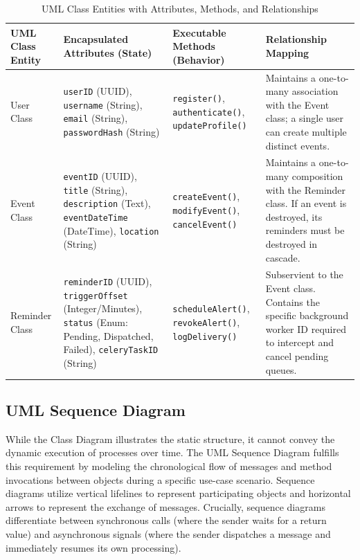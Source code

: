 \begin{table}[h]
	\centering
	\caption{UML Class Entities with Attributes, Methods, and Relationships}
	\label{tab:uml-class-diagram}
	\renewcommand{\arraystretch}{1.3}
	\begin{tabular}{|>{\raggedright\arraybackslash}p{}|>{\raggedright\arraybackslash}p{}|>{\raggedright\arraybackslash}p{}|>{\raggedright\arraybackslash}p{}|}
		\hline
		\textbf{UML Class Entity} & \textbf{Encapsulated Attributes (State)} & \textbf{Executable Methods (Behavior)} & \textbf{Relationship Mapping} \\
		\hline
		User Class &
		\texttt{userID} (UUID), \texttt{username} (String), \texttt{email} (String), \texttt{passwordHash} (String) &
		\texttt{register()}, \texttt{authenticate()}, \texttt{updateProfile()} &
		Maintains a one-to-many association with the Event class; a single user can create multiple distinct events. \\
		\hline
		Event Class &
		\texttt{eventID} (UUID), \texttt{title} (String), \texttt{description} (Text), \texttt{eventDateTime} (DateTime), \texttt{location} (String) &
		\texttt{createEvent()}, \texttt{modifyEvent()}, \texttt{cancelEvent()} &
		Maintains a one-to-many composition with the Reminder class. If an event is destroyed, its reminders must be destroyed in cascade. \\
		\hline
		Reminder Class &
		\texttt{reminderID} (UUID), \texttt{triggerOffset} (Integer/Minutes), \texttt{status} (Enum: Pending, Dispatched, Failed), \texttt{celeryTaskID} (String) &
		\texttt{scheduleAlert()}, \texttt{revokeAlert()}, \texttt{logDelivery()} &
		Subservient to the Event class. Contains the specific background worker ID required to intercept and cancel pending queues. \\
		\hline
	\end{tabular}
\end{table}

\subsection{UML Sequence Diagram}

While the Class Diagram illustrates the static structure, it cannot convey the dynamic execution of processes over time. The UML Sequence Diagram fulfills this requirement by modeling the chronological flow of messages and method invocations between objects during a specific use-case scenario. Sequence diagrams utilize vertical lifelines to represent participating objects and horizontal arrows to represent the exchange of messages. Crucially, sequence diagrams differentiate between synchronous calls (where the sender waits for a return value) and asynchronous signals (where the sender dispatches a message and immediately resumes its own processing).

